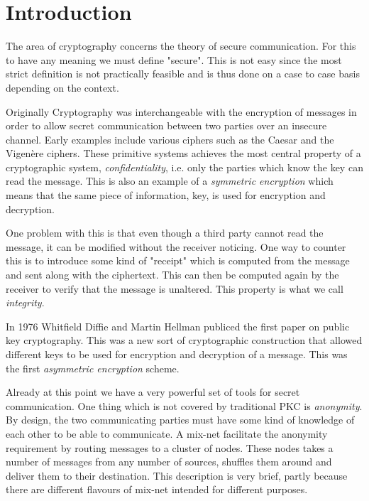 \section{Introduction}



The area of cryptography concerns the theory of secure communication. For this to have any meaning we must define "secure". This is not easy since the most strict definition is not practically feasible and is thus done on a case to case basis depending on the context.

Originally Cryptography was interchangeable with the encryption of messages in order to allow secret communication between two parties over an insecure channel. Early examples include various ciphers such as the Caesar and the Vigenère ciphers. These primitive systems achieves the most central property of a cryptographic system, \emph{confidentiality}, i.e. only the parties which know the key can read the message. This is also an example of a \emph{symmetric encryption} which means that the same piece of information, key, is used for encryption and decryption.

One problem with this is that even though a third party cannot read the message, it can be modified without the receiver noticing. One way to counter this is to introduce some kind of "receipt" which is computed from the message and sent along with the ciphertext. This can then be computed again by the receiver to verify that the message is unaltered. This property is what we call \emph{integrity}.

In 1976 Whitfield Diffie and Martin Hellman publiced the first paper on public key cryptography. This was a new sort of cryptographic construction that allowed different keys to be used for encryption and decryption of a message. This was the first \emph{asymmetric encryption} scheme.

Already at this point we have a very powerful set of tools for secret communication. One thing which is not covered by traditional PKC is \emph{anonymity}. By design, the two communicating parties must have some kind of knowledge of each other to be able to communicate. A mix-net facilitate the anonymity requirement by routing messages to a cluster of nodes. These nodes takes a number of messages from any number of sources, shuffles them around and deliver them to their destination. This description is very brief, partly because there are different flavours of mix-net intended for different purposes.

